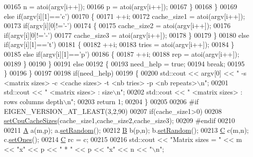 \begin{DoxyCode}
00165           n = atoi(argv[i++]);
00166           p = atoi(argv[i++]);
00167         \}
00168       \}
00169       \textcolor{keywordflow}{else} \textcolor{keywordflow}{if}(argv[i][1]==\textcolor{charliteral}{'c'})
00170       \{
00171         ++i;
00172         cache\_size1 = atoi(argv[i++]);
00173         \textcolor{keywordflow}{if}(argv[i][0]!=\textcolor{charliteral}{'-'})
00174         \{
00175           cache\_size2 = atoi(argv[i++]);
00176           \textcolor{keywordflow}{if}(argv[i][0]!=\textcolor{charliteral}{'-'})
00177             cache\_size3 = atoi(argv[i++]);
00178         \}
00179       \}
00180       \textcolor{keywordflow}{else} \textcolor{keywordflow}{if}(argv[i][1]==\textcolor{charliteral}{'t'})
00181       \{
00182         ++i;
00183         tries = atoi(argv[i++]);
00184       \}
00185       \textcolor{keywordflow}{else} \textcolor{keywordflow}{if}(argv[i][1]==\textcolor{charliteral}{'p'})
00186       \{
00187         ++i;
00188         rep = atoi(argv[i++]);
00189       \}
00190     \}
00191     \textcolor{keywordflow}{else}
00192     \{
00193       need\_help = \textcolor{keyword}{true};
00194       \textcolor{keywordflow}{break};
00195     \}
00196   \}
00197 
00198   \textcolor{keywordflow}{if}(need\_help)
00199   \{
00200     std::cout << argv[0] << \textcolor{stringliteral}{" -s <matrix sizes> -c <cache sizes> -t <nb tries> -p <nb repeats>\(\backslash\)n"};
00201     std::cout << \textcolor{stringliteral}{"   <matrix sizes> : size\(\backslash\)n"};
00202     std::cout << \textcolor{stringliteral}{"   <matrix sizes> : rows columns depth\(\backslash\)n"};
00203     \textcolor{keywordflow}{return} 1;
00204   \}
00205 
00206 \textcolor{preprocessor}{#if EIGEN\_VERSION\_AT\_LEAST(3,2,90)}
00207   \textcolor{keywordflow}{if}(cache\_size1>0)
00208     \hyperlink{namespace_eigen_ae64421554aa0a4bf9258bafe3170102b}{setCpuCacheSizes}(cache\_size1,cache\_size2,cache\_size3);
00209 \textcolor{preprocessor}{#endif}
00210   
00211   \hyperlink{group___core___module_class_eigen_1_1_matrix}{A} a(m,p); a.\hyperlink{class_eigen_1_1_plain_object_base_af0e576a0e1aefc9ee346de44cc352ba3}{setRandom}();
00212   \hyperlink{group___core___module_class_eigen_1_1_matrix}{B} b(p,n); b.\hyperlink{class_eigen_1_1_plain_object_base_af0e576a0e1aefc9ee346de44cc352ba3}{setRandom}();
00213   \hyperlink{group___core___module}{C} c(m,n); c.\hyperlink{class_eigen_1_1_plain_object_base_a2871e88e1feb1cc665fa1f1cc800078b}{setOnes}();
00214   \hyperlink{group___core___module}{C} rc = c;
00215 
00216   std::cout << \textcolor{stringliteral}{"Matrix sizes = "} << m << \textcolor{stringliteral}{"x"} << p << \textcolor{stringliteral}{" * "} << p << \textcolor{stringliteral}{"x"} << n << \textcolor{stringliteral}{"\(\backslash\)n"};

\end{DoxyCode}
